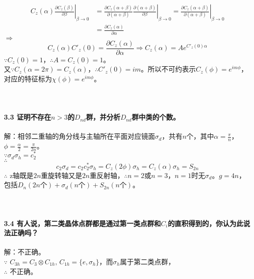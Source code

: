 \documentclass[12pt]{article}
\numberwithin{equation}{section}	 %
\begin{document}
\begin{spacing}{1.5}
\begin{align*}
C_{z}(\alpha) \left.\frac{\partial C_{z}(\beta)}{\partial \beta}\right|_{\beta\rightarrow0} &= \left.\frac{\partial C_{z}(\alpha+\beta)}{\partial (\alpha+\beta)} \frac{\partial (\alpha+\beta)}{\partial \beta}\right|_{\beta\rightarrow0} = \left.\frac{\partial C_{z}(\alpha+\beta)}{\partial (\alpha+\beta)}\right|_{\beta\rightarrow0} \\
&= \frac{\partial C_{z}(\alpha)}{\partial \alpha}
\end{align*}
$\Longrightarrow$
\begin{equation}
C_{z}(\alpha)C'_{z}(0) = \frac{\partial C_{z}(\alpha)}{\partial \alpha} \Rightarrow C_{z}(\alpha) = Ae^{C'_{z}(0)\alpha}
\end{equation}
$\because C_{z}(0)=1$，$\therefore A=C_{z}(0)=1$。\\
又$\because C_{z}(\alpha=2\pi)=C_{z}(\alpha)$，$\therefore C'_{z}(0)=im$。所以不可约表示$C_{z}(\phi)=e^{im\phi}$，对应的特征标为$\chi(\phi)=e^{im\phi}$。\\
~\\
~\\
~\\
\textbf{3.3 \quad 证明不存在$n > 3$的$D_{nd}$群，并分析$D_{nd}$群中类的个数。}\\
~\\
解：相邻二重轴的角分线与主轴所在平面对应镜面$\sigma_{d}$，共有$n$个，其中$\displaystyle \alpha = \frac{\pi}{n}$，$\displaystyle \phi = \frac{\alpha}{2} = \frac{\pi}{2n}$。\\
$\because \sigma_{d}\sigma_{h} = c_{2}^{*}$ \\
$\therefore$
\begin{equation}
c_{2}\sigma_{d} = c_{2}c_{2}^{*}\sigma_{h} = C_{z}(2\phi)\sigma_{h} = C_{z}(\alpha)\sigma_{h} = S_{2n}
\end{equation}
$\therefore$ z轴既是$2n$重旋转轴又是$2n$重反射轴，$\therefore n=2$或$n=3$，$n=1$时无$\sigma_{d}$。$g=4n$，包括$D_{n}(2n\text{个})+\sigma_{d}(n\text{个})+S_{2n}(n\text{个})$。\\
~\\
~\\
~\\
\textbf{3.4 \quad 有人说，第二类晶体点群都是通过第一类点群和$C_{i}$的直积得到的，你认为此说法正确吗？}\\
~\\
解：不正确。\\
$\because$ $C_{3h} = C_{3} \otimes C_{1h}, \, C_{1h}=\{e,\sigma_{h}\}$，而$\sigma_{h}$属于第二类点群，\\
$\therefore$ 不正确。

\end{spacing}
\end{document}
